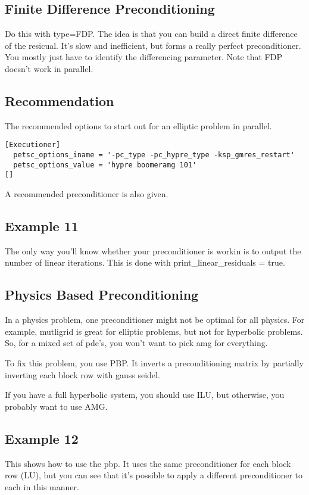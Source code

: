 \subsection{Finite Difference Preconditioning}

Do this with type=FDP. The idea is that you can build a direct finite difference 
of the resicual. It's slow and inefficient, but forms a really perfect 
preconditioner. You mostly just have to identify the differencing parameter. 
Note that FDP doesn't work in parallel. 

\subsection{Recommendation}
The recommended options to start out for an elliptic problem in parallel.  

\begin{verbatim}
[Executioner]
  petsc_options_iname = '-pc_type -pc_hypre_type -ksp_gmres_restart'
  petsc_options_value = 'hypre boomeramg 101'
[]
\end{verbatim}

A recommended preconditioner is also given. 

\subsection{Example 11}
The only way you'll know whether your preconditioner is workin is to output the 
number of linear iterations. This is done with print\_linear\_residuals = true.

\subsection{Physics Based Preconditioning}
In a physics problem, one preconditioner might not be optimal for all physics. 
For example, mutligrid is great for elliptic problems, but not for hyperbolic 
problems. So, for a mixed set of pde's, you won't want to pick amg for 
everything. 

To fix this problem, you use PBP. It inverts a preconditioning matrix by 
partially inverting each block row with gauss seidel.

If you have a full hyperbolic system, you should use ILU, but otherwise, you 
probably want to use AMG. 

\subsection{Example 12}
This shows how to use the pbp. It uses the same preconditioner for each block 
row (LU), but you can see that it's possible to apply a different 
preconditioner to each in this manner. 



